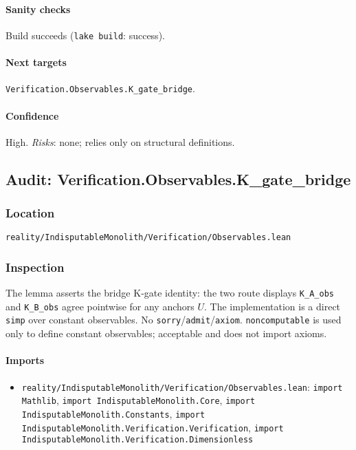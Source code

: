\documentclass{article}
\newcommand{\FileRef}[1]{\texttt{#1}}
\begin{document}
\paragraph{Sanity checks}
Build succeeds (\texttt{lake build}: success).

\paragraph{Next targets} \texttt{Verification.Observables.K\_gate\_bridge}.

\paragraph{Confidence} High. \textit{Risks}: none; relies only on structural definitions.

\subsection{Audit: Verification.Observables.K\_gate\_bridge}
\subsubsection{Location}
\FileRef{reality/IndisputableMonolith/Verification/Observables.lean}

\subsubsection{Inspection}
The lemma asserts the bridge K‑gate identity: the two route displays \texttt{K\_A\_obs} and \texttt{K\_B\_obs} agree pointwise for any anchors \(U\). The implementation is a direct \texttt{simp} over constant observables. No \texttt{sorry}/\texttt{admit}/\texttt{axiom}. \texttt{noncomputable} is used only to define constant observables; acceptable and does not import axioms.

\paragraph{Imports}
\begin{itemize}[leftmargin=*]
  \item \FileRef{reality/IndisputableMonolith/Verification/Observables.lean}: \texttt{import Mathlib}, \texttt{import IndisputableMonolith.Core}, \texttt{import IndisputableMonolith.Constants}, \texttt{import IndisputableMonolith.Verification.Verification}, \texttt{import IndisputableMonolith.Verification.Dimensionless}
\end{itemize}
\end{document}
